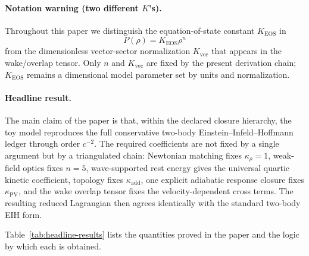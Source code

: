 \documentclass[11pt]{article}
\newcommand{\kadd}{\kappa_{\mathrm{add}}}
\newcommand{\kPV}{\kappa_{\mathrm{PV}}}
\newcommand{\krho}{\kappa_{\rho}}
\newcommand{\Kvec}{K_{\mathrm{vec}}}
\newcommand{\KEOS}{K_{\mathrm{EOS}}}
\begin{document}
\paragraph{Notation warning (two different \(K\)'s).}
Throughout this paper we distinguish the equation-of-state constant \(\KEOS\) in
\[
P(\rho)=\KEOS \rho^n
\]
from the dimensionless vector-sector normalization \(\Kvec\) that appears in the wake/overlap tensor. Only \(n\) and \(\Kvec\) are fixed by the present derivation chain; \(\KEOS\) remains a dimensional model parameter set by units and normalization.

\paragraph{Headline result.}
The main claim of the paper is that, within the declared closure hierarchy, the toy model reproduces the full conservative two-body Einstein--Infeld--Hoffmann ledger through order \(c^{-2}\). The required coefficients are not fixed by a single argument but by a triangulated chain:
Newtonian matching fixes \(\krho=1\), weak-field optics fixes \(n=5\), wave-supported rest energy gives the universal quartic kinetic coefficient, topology fixes \(\kadd\), one explicit adiabatic response closure fixes \(\kPV\), and the wake overlap tensor fixes the velocity-dependent cross terms. The resulting reduced Lagrangian then agrees identically with the standard two-body EIH form.

Table~\ref{tab:headline-results} lists the quantities proved in the paper and the logic by which each is obtained.
\end{document}
